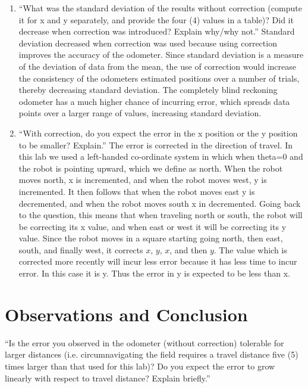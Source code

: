 \documentclass[twocolumn]{article}
\begin{document}
\begin{enumerate}

\item ``What was the standard deviation of the results without correction (compute it for x and y separately, and provide the four (4) values in a table)? Did it decrease when correction was introduced? Explain why/why not.\cite{lab2}'' Standard deviation decreased when correction was used because using correction improves the accuracy of the odometer. Since standard deviation is a measure of the deviation of data from the mean, the use of correction would increase the consistency of the odometers estimated positions over a number of trials, thereby decreasing standard deviation. The completely blind reckoning odometer has a much higher chance of incurring error, which spreads data points over a larger range of values, increasing standard deviation.

\item ``With correction, do you expect the error in the x position or the y position to be smaller? Explain.'' The error is corrected in the direction of travel. In this lab we used a left-handed co-ordinate system in which when theta=0 and the robot is pointing upward, which we define as north. When the robot moves north, x is incremented, and when the robot moves west, y is incremented. It then follows that when the robot moves east y is decremented, and when the robot moves south x in decremented. Going back to the question, this means that when traveling north or south, the robot will be correcting its x value, and when east or west it will be correcting its y value. Since the robot moves in a square starting going north, then east, south, and finally west, it corrects $x$, $y$, $x$, and then $y$. The value which is corrected more recently will incur less error because it has less time to incur error. In this case it is y. Thus the error in y is expected to be less than x.

\end{enumerate}

\section{Observations and Conclusion}

``Is the error you observed in the odometer (without correction) tolerable for larger distances (i.e. circumnavigating the field requires a travel distance five (5) times larger than that used for this lab)? Do you expect the error to grow linearly with respect to travel distance? Explain briefly.\cite{lab2}''
\end{document}
